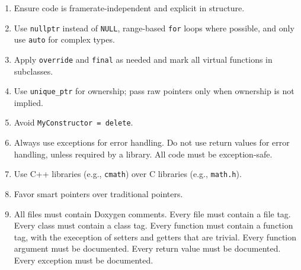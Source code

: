 \documentclass{article}
\begin{document}
\begin{enumerate}[left=0pt, align=left]
    \item Ensure code is framerate-independent and explicit in structure.

    \item Use \texttt{nullptr} instead of \texttt{NULL}, range-based \texttt{for} loops where possible, and only use \texttt{auto} for complex types.

    \item Apply \texttt{override} and \texttt{final} as needed and mark all virtual functions in subclasses.

    \item Use \texttt{unique\_ptr} for ownership; pass raw pointers only when ownership is not implied.

    \item Avoid \texttt{MyConstructor = delete}.
    
    \item Always use exceptions for error handling. Do not use return values for error handling, unless required by a library. All code must be exception-safe.

    \item Use C++ libraries (e.g., \texttt{cmath}) over C libraries (e.g., \texttt{math.h}).

    \item Favor smart pointers over traditional pointers.
    
    \item All files must contain Doxygen comments.
        \subitem Every file must contain a file tag.
        \subitem Every class must contain a class tag.
        \subitem Every function must contain a function tag, with the exeception of setters and getters that are trivial. 
        \subitem Every function argument must be documented. 
        \subitem Every return value must be documented.
        \subitem Every exception must be documented.
 
\end{enumerate}
\end{document}
